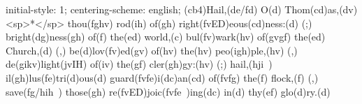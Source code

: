 initial-style: 1;
centering-scheme: english;
(cb4)Hail,(de/fd) O(d) Thom(cd)as,(dv) <sp>*</sp> thou(fghv) rod(ih) of(gh) right(fvED)eous(cd)ness:(d) (;) bright(dg)ness(gh) of(f) the(ed) world,(c) bul(fv)wark(hv) of(gvgf) the(ed) Church,(d) (,) be(d)lov(fv)ed(gv) of(hv) the(hv) peo(igh)ple,(hv) (,) de(gikv)light(jvIH) of(iv) the(gf) cler(gh)gy:(hv) (;) hail,(hji~) il(gh)lus(fe)tri(d)ous(d) guard(fvfe)i(dc)an(cd) of(fvfg) the(f) flock,(f) (,) save(fg/hih~) those(gh) re(fvED)joic(fvfe~)ing(dc) in(d) thy(ef) glo(d)ry.(d)
